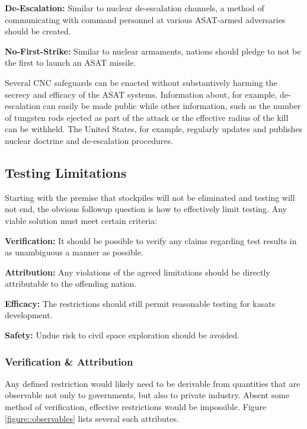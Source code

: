 \textbf{De-Escalation:} Similar to nuclear de-escalation channels, a
method of communicating with command personnel at various ASAT-armed
adversaries should be created.

\textbf{No-First-Strike:} Similar to nuclear armaments, nations should
pledge to not be the first to launch an ASAT missile.

Several CNC safeguards can be enacted without substantively harming
the secrecy and efficacy of the ASAT systems.  Information about, for
example, de-escalation can easily be made public while other
information, such as the number of tungsten rods ejected as part of
the attack or the effective radius of the kill can be withheld.  The
United States, for example, regularly updates and publishes nuclear
doctrine and de-escalation procedures.\cite[What to cite for this
  one??? Ask foster]{xxx}

\subsection{Testing Limitations}
Starting with the premise that stockpiles will not be eliminated and
testing will not end, the obvious followup question is how to
effectively limit testing.  Any viable solution must meet certain
criteria:

\textbf{Verification:} It should be possible to verify any claims
regarding test results in as unambiguous a manner as possible.

\textbf{Attribution:} Any violations of the agreed limitations should
be directly attributable to the offending nation.

\textbf{Efficacy:} The restrictions should still permit reasonable
testing for \acp{kasat} development.

\textbf{Safety:} Undue risk to civil space exploration should be
avoided.

\subsubsection{Verification \& Attribution}
Any defined restriction would likely need to be derivable from
quantities that are observable not only to governments, but also to
private industry.  Absent some method of verification, effective
restrictions would be impossible.  Figure \ref{figure::observables}
lists several such attributes.

